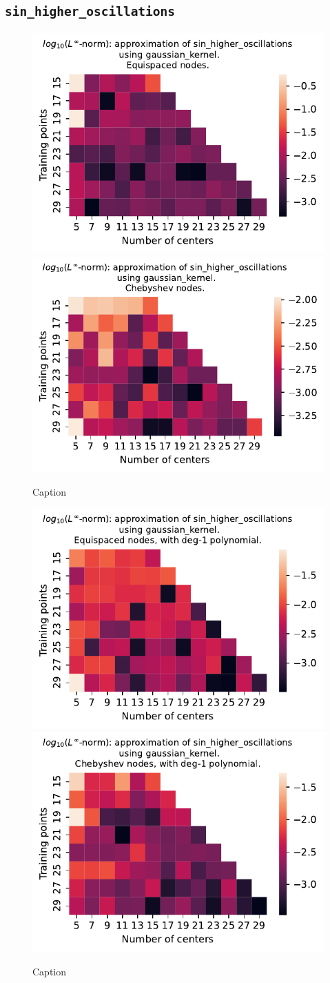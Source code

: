 \documentclass[12pt]{report} %
\begin{document}
\subsection*{\texttt{sin\_higher\_oscillations}}

\begin{figure}[ht]
    \centering
    
    \includegraphics[width=.49\textwidth]{imagenes/experiments/1d/variational/sin_higher_oscillations-Kgaussian_kernel-Equi.pdf}
    \includegraphics[width=.49\textwidth]{imagenes/experiments/1d/variational/sin_higher_oscillations-Kgaussian_kernel-Cheb.pdf}
    \caption{Caption}
    \label{fig:sin-higher-oscillations-gaussian}
\end{figure}

\begin{figure}[ht]
    \centering
    
    \includegraphics[width=.49\textwidth]{imagenes/experiments/1d/variational/sin_higher_oscillations-Kgaussian_kernel-Poly-Equi.pdf}
    \includegraphics[width=.49\textwidth]{imagenes/experiments/1d/variational/sin_higher_oscillations-Kgaussian_kernel-Poly-Cheb.pdf}
    \caption{Caption}
    \label{fig:sin-higher-oscillations-gaussian-poly}
\end{figure}
\end{document}
